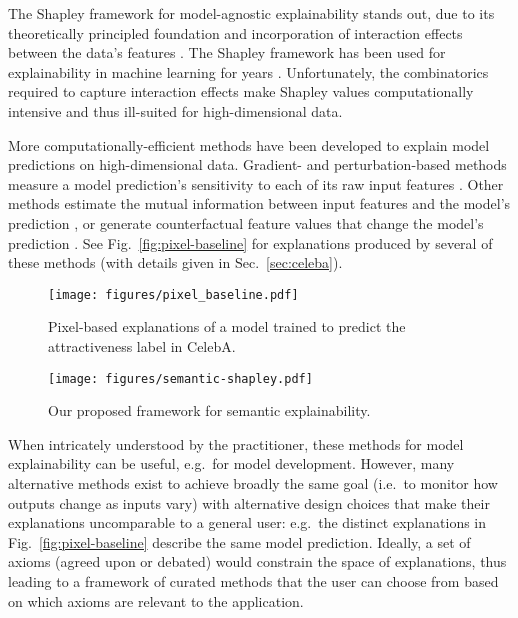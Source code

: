 \documentclass{article}
\DeclareRobustCommand{\Sec}[1]{Sec.~\ref{sec:#1}}
\DeclareRobustCommand{\Fig}[1]{Fig.~\ref{fig:#1}}
\begin{document}
The Shapley framework for model-agnostic explainability stands out, due to its theoretically principled foundation and incorporation of interaction effects between the data's features \citep{shapley52,SHAP}. The Shapley framework has been used for explainability in machine learning for years \citep{lipovetsky2001analysis, kononenko2010efficient, vstrumbelj2014explaining, datta2016algorithmic}. Unfortunately, the combinatorics required to capture interaction effects make Shapley values computationally intensive and thus ill-suited for high-dimensional data.

More computationally-efficient methods have been developed to explain model predictions on high-dimensional data. Gradient- and perturbation-based methods measure a model prediction's sensitivity to each of its raw input features \citep{GradCam,GlobalAveragePooling,PredDiffAnalysis}. Other methods estimate the mutual information between input features and the model's prediction \citep{pmlr-v80-chen18j,InformationBottleneckSaliency}, or generate counterfactual feature values that change the model's prediction \citep{HaoCounterfactual,CounterfactualVisualExplanations,CounterfactualClass}. See \Fig{pixel-baseline} for explanations produced by several of these methods (with details given in \Sec{celeba}).


\begin{figure}[!tbp]
  \centering
  \begin{minipage}[b]{0.57\textwidth}
    \texttt{[image: figures/pixel\_baseline.pdf]}
    \caption{Pixel-based explanations of a model trained to predict the attractiveness label in CelebA.}
    \label{fig:pixel-baseline}
  \end{minipage}
  \hfill
  \begin{minipage}[b]{0.37\textwidth}
    \texttt{[image: figures/semantic-shapley.pdf]}
    \caption{Our proposed framework for semantic explainability.}
    \label{fig:framework}
  \end{minipage}
\end{figure}


When intricately understood by the practitioner, these methods for model explainability can be useful, e.g.~for model development. However, many alternative methods exist to achieve broadly the same goal (i.e.~to monitor how outputs change as inputs vary) with alternative design choices that make their explanations uncomparable to a general user: e.g.~the distinct explanations in \Fig{pixel-baseline} describe the same model prediction. Ideally, a set of axioms (agreed upon or debated) would constrain the space of explanations, thus leading to a framework of curated methods that the user can choose from based on which axioms are relevant to the application. 
    
\end{document}
